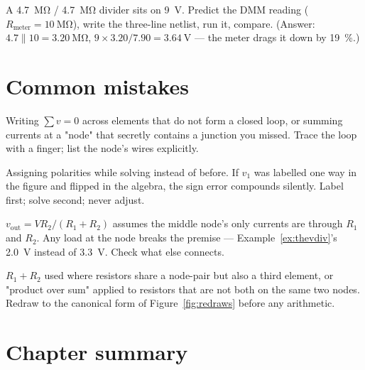 \begin{exercise}
A \qty{4.7}{\mega\ohm} / \qty{4.7}{\mega\ohm} divider sits on \qty{9}{\volt}.
Predict the DMM reading ($R_{\mathrm{meter}}=\qty{10}{\mega\ohm}$), write the
three-line netlist, run it, compare. (Answer: $4.7\|10=\qty{3.20}{\mega\ohm}$,
$9\times3.20/7.90=\qty{3.64}{\volt}$ — the meter drags it down by
\qty{19}{\percent}.)
\end{exercise}

\section{Common mistakes}
\label{sec:mistakes3}

\begin{tripwire}
Writing $\sum v = 0$ across elements that do not form a closed loop, or
summing currents at a "node" that secretly contains a junction you missed.
Trace the loop with a finger; list the node's wires explicitly.
\end{tripwire}

\begin{tripwire}
Assigning polarities while solving instead of before. If $v_1$ was labelled
one way in the figure and flipped in the algebra, the sign error compounds
silently. Label first; solve second; never adjust.
\end{tripwire}

\begin{tripwire}
$v_{\mathrm{out}} = V R_2/(R_1+R_2)$ assumes the middle node's only currents
are through $R_1$ and $R_2$. Any load at the node breaks the premise —
Example~\ref{ex:thevdiv}'s \qty{2.0}{\volt} instead of \qty{3.3}{\volt}.
Check what else connects.
\end{tripwire}

\begin{tripwire}
$R_1+R_2$ used where resistors share a node-pair but also a third element,
or "product over sum" applied to resistors that are not both on the same two
nodes. Redraw to the canonical form of Figure~\ref{fig:redraws} before any
arithmetic.
\end{tripwire}

\section{Chapter summary}
\label{sec:ch3summary}

